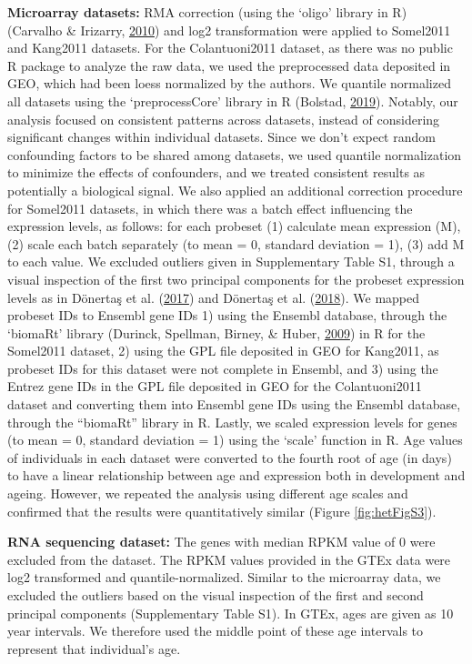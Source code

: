 \documentclass[12pt,twoside]{unicam}
\begin{document}
\textbf{Microarray datasets:} RMA correction (using the `oligo' library in R) (Carvalho \& Irizarry, \protect\hyperlink{ref-Carvalho2010}{2010}) and log2 transformation were applied to Somel2011 and Kang2011 datasets. For the Colantuoni2011 dataset, as there was no public R package to analyze the raw data, we used the preprocessed data deposited in GEO, which had been loess normalized by the authors. We quantile normalized all datasets using the `preprocessCore' library in R (Bolstad, \protect\hyperlink{ref-Bolstad2019}{2019}). Notably, our analysis focused on consistent patterns across datasets, instead of considering significant changes within individual datasets. Since we don't expect random confounding factors to be shared among datasets, we used quantile normalization to minimize the effects of confounders, and we treated consistent results as potentially a biological signal. We also applied an additional correction procedure for Somel2011 datasets, in which there was a batch effect influencing the expression levels, as follows: for each probeset (1) calculate mean expression (M), (2) scale each batch separately (to mean = 0, standard deviation = 1), (3) add M to each value. We excluded outliers given in Supplementary Table S1, through a visual inspection of the first two principal components for the probeset expression levels as in Dönertaş et al. (\protect\hyperlink{ref-Donertas2017}{2017}) and Dönertaş et al. (\protect\hyperlink{ref-Donertas2018}{2018}). We mapped probeset IDs to Ensembl gene IDs 1) using the Ensembl database, through the `biomaRt' library (Durinck, Spellman, Birney, \& Huber, \protect\hyperlink{ref-Durinck2009}{2009}) in R for the Somel2011 dataset, 2) using the GPL file deposited in GEO for Kang2011, as probeset IDs for this dataset were not complete in Ensembl, and 3) using the Entrez gene IDs in the GPL file deposited in GEO for the Colantuoni2011 dataset and converting them into Ensembl gene IDs using the Ensembl database, through the ``biomaRt'' library in R. Lastly, we scaled expression levels for genes (to mean = 0, standard deviation = 1) using the `scale' function in R. Age values of individuals in each dataset were converted to the fourth root of age (in days) to have a linear relationship between age and expression both in development and ageing. However, we repeated the analysis using different age scales and confirmed that the results were quantitatively similar (Figure \ref{fig:hetFigS3}).

\textbf{RNA sequencing dataset:} The genes with median RPKM value of 0 were excluded from the dataset. The RPKM values provided in the GTEx data were log2 transformed and quantile-normalized. Similar to the microarray data, we excluded the outliers based on the visual inspection of the first and second principal components (Supplementary Table S1). In GTEx, ages are given as 10 year intervals. We therefore used the middle point of these age intervals to represent that individual's age.
\end{document}

